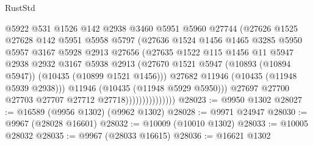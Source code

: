 \begin{lexlean}{RustStd}
\begin{coremodule}
                                @5922
                                @531
                                @1526
                                @142
                                @2938
                                @3460
                                @5951
                                @5960
                                @27744
                                (@27626
                                  @1525
                                  @27628
                                  @142
                                  @5951
                                  @5958
                                  @5797
                                  (@27636
                                    @1524
                                    @1456
                                    @1465
                                    @3285
                                    @5950
                                    @5957
                                    @3167
                                    @5928
                                    @2913
                                    @27656
                                    (@27635
                                      @1522
                                      @115
                                      @1456
                                      @11
                                      @5947
                                      @2938
                                      @2932
                                      @3167
                                      @5938
                                      @2913
                                      (@27670
                                        @1521
                                        @5947
                                        (@10893 (@10894 @5947))
                                        (@10435 (@10899 @1521 @1456)))
                                      @27682
                                      @11946
                                      (@10435 (@11948 @5939 @2938)))
                                    @11946
                                    (@10435 (@11948 @5929 @5950)))
                                  @27697
                                  @27700
                                  @27703
                                  @27707
                                  @27712
                                  @27718)))))))))))))))
@28023 := @9950 @1302
@28027 := @16589 (@9956 @1302) (@9962 @1302)
@28028 := @9971 @24947
@28030 := @9967 (@28028 @16601)
@28032 := @10009 (@10010 @1302)
@28033 := @10005 @28032
@28035 := @9967 (@28033 @16615)
@28036 := @16621 @1302

\end{coremodule}
\end{lexlean}
